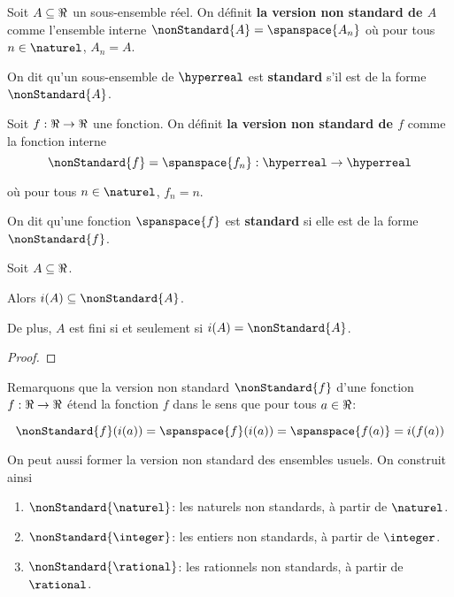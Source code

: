 \documentclass[a4paper, 12pt]{report}
\begin{document}
\begin{definition}
	Soit $A \subseteq \real$ un sous-ensemble réel. On définit \textbf{la
	version non standard de $A$} comme l'ensemble interne $\nonStandard{A} =
	\spanspace{A_{n}}$ où pour tous $n \in \naturel$, $A_{n} = A$.

	On dit qu'un sous-ensemble de $\hyperreal$ est \textbf{standard} s'il
	est de la forme $\nonStandard{A}$.
\end{definition}

\begin{definition}
	Soit $f : \real \rightarrow \real$ une fonction. On définit \textbf{la
	version non standard de $f$} comme la fonction interne
	\begin{equation}
		\nonStandard{f} = \spanspace{f_{n}} : \hyperreal \rightarrow \hyperreal
	\end{equation}

	où pour tous $n \in \naturel$, $f_{n} = n$.

	On dit qu'une fonction $\spanspace{f}$ est \textbf{standard} si elle est
	de la forme $\nonStandard{f}$.
\end{definition}


\begin{proposition}
	Soit $A \subseteq \real$.

	Alors $i(A) \subseteq \nonStandard{A}$.

	De plus, $A$ est fini si et seulement si $i(A) = \nonStandard{A}$.
\end{proposition}

\ifdefined\outputproof
\begin{proof}

\end{proof}
\fi

Remarquons que la version non standard $\nonStandard{f}$ d'une fonction $f :
\real \rightarrow \real$ étend la fonction $f$ dans le sens que pour tous $a \in
\real$:

\begin{equation}
	\nonStandard{f}(i(a)) = \spanspace{f}(i(a)) = \spanspace{f(a)} = i(f(a))
\end{equation}

On peut aussi former la version non standard des ensembles usuels. On construit
ainsi
\begin{enumerate}
	\item $\nonStandard{\naturel}$: les naturels non standards, à partir de
		$\naturel$.
	\item $\nonStandard{\integer}$: les entiers non standards, à partir de
		$\integer$.
	\item $\nonStandard{\rational}$: les rationnels non standards, à partir de
		$\rational$.
\end{enumerate}
\end{document}
